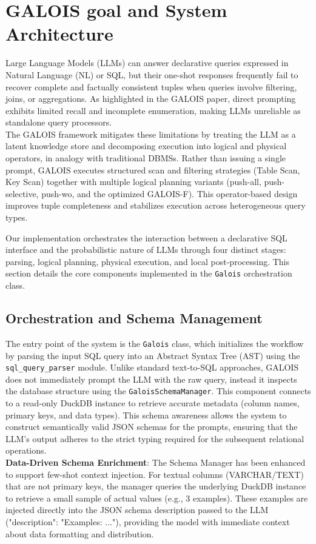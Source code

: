 \section{GALOIS goal and System Architecture}

Large Language Models (LLMs) can answer declarative queries expressed in Natural
Language (NL) or SQL, but their one-shot responses frequently fail to recover complete
and factually consistent tuples when queries involve filtering, joins, or aggregations. As
highlighted in the GALOIS paper, direct prompting exhibits limited recall and incomplete
enumeration, making LLMs unreliable as standalone query processors.
\\
The GALOIS framework mitigates these limitations by treating the LLM as a latent
knowledge store and decomposing execution into logical and physical operators, in
analogy with traditional DBMSs. Rather than issuing a single prompt, GALOIS executes
structured scan and filtering strategies (Table Scan, Key Scan) together with multiple
logical planning variants (push-all, push-selective, push-wo, and the optimized
GALOIS-F). This operator-based design improves tuple completeness and stabilizes
execution across heterogeneous query types.

Our implementation orchestrates the interaction between a declarative SQL interface and the probabilistic nature of LLMs through four distinct stages: parsing, logical planning, physical execution, and local post-processing. This section details the core components implemented in the \texttt{Galois} orchestration class.


\subsection{Orchestration and Schema Management}

\begin{sloppypar}
The entry point of the system is the \texttt{Galois} class, which initializes the workflow by parsing the input SQL query into an Abstract Syntax Tree (AST) using the \texttt{sql\_query\_parser} module. Unlike standard text-to-SQL approaches, GALOIS does not immediately prompt the LLM with the raw query, instead it inspects the database structure using the \texttt{GaloisSchemaManager}.
This component connects to a read-only DuckDB instance to retrieve accurate metadata (column names, primary keys, and data types). This schema awareness allows the system to construct semantically valid JSON schemas for the prompts, ensuring that the LLM's output adheres to the strict typing required for the subsequent relational operations.
\\\textbf{Data-Driven Schema Enrichment}: The Schema Manager has been enhanced to support few-shot context injection. For textual columns (VARCHAR/TEXT) that are not primary keys, the manager queries the underlying DuckDB instance to retrieve a small sample of actual values (e.g., 3 examples).
These examples are injected directly into the JSON schema description passed to the LLM ("description": "Examples: ..."), providing the model with immediate context about data formatting and distribution.

\end{sloppypar}

